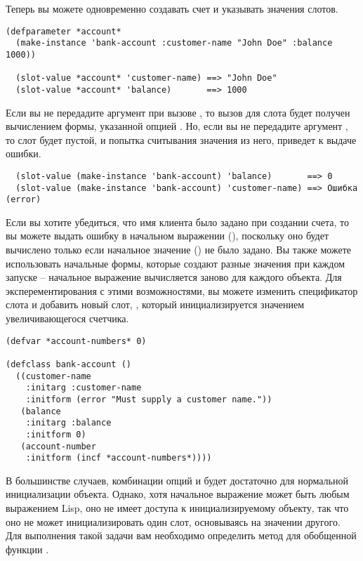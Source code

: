 Теперь вы можете одновременно создавать счет и указывать значения слотов.

\begin{lstlisting}
(defparameter *account*
  (make-instance 'bank-account :customer-name "John Doe" :balance 1000))

  (slot-value *account* 'customer-name) ==> "John Doe"
  (slot-value *account* 'balance)       ==> 1000
\end{lstlisting}

Если вы не передадите аргумент  при вызове , то вызов
 для слота  будет получен вычислением формы, указанной
опцией .  Но, если вы не передадите аргумент , то
слот  будет пустой, и попытка считывания значения из него, приведет к
выдаче ошибки.

\begin{verbatim}
  (slot-value (make-instance 'bank-account) 'balance)       ==> 0
  (slot-value (make-instance 'bank-account) 'customer-name) ==> Ошибка (error)
\end{verbatim}

Если вы хотите убедиться, что имя клиента было задано при создании счета, то вы можете
выдать ошибку в начальном выражении (), поскольку оно будет вычислено
только если начальное значение () не было задано.  Вы также можете
использовать начальные формы, которые создают разные значения при каждом запуске --
начальное выражение вычисляется заново для каждого объекта.  Для эксперементирования с
этими возможностями, вы можете изменить спецификатор слота  и добавить
новый слот, , который инициализируется значением увеличивающегося
счетчика.

\begin{lstlisting}
(defvar *account-numbers* 0)

(defclass bank-account ()
  ((customer-name
    :initarg :customer-name
    :initform (error "Must supply a customer name."))
   (balance
    :initarg :balance
    :initform 0)
   (account-number
    :initform (incf *account-numbers*))))
\end{lstlisting}

В большинстве случаев, комбинации опций  и  будет
достаточно для нормальной инициализации объекта.  Однако, хотя начальное выражение может
быть любым выражением Lisp, оно не имеет доступа к инициализируемому объекту, так что оно
не может инициализировать один слот, основываясь на значении другого.  Для выполнения
такой задачи вам необходимо определить метод для обобщенной функции
.

